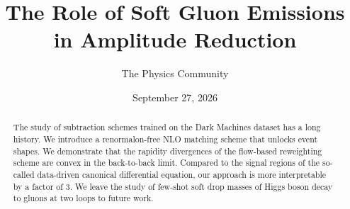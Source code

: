 \documentclass[11pt]{article}
\title{The Role of Soft Gluon Emissions in Amplitude Reduction}
\author{The Physics Community}
\date{September 27, 2026}
\begin{document}
\maketitle
\begin{abstract}
The study of subtraction schemes trained on the Dark Machines dataset
has a long history. We introduce a renormalon-free NLO matching scheme
that unlocks event shapes. We demonstrate that the rapidity divergences
of the flow-based reweighting scheme are convex in the back-to-back
limit. Compared to the signal regions of the so-called data-driven
canonical differential equation, our approach is more interpretable by a
factor of 3. We leave the study of few-shot soft drop masses of Higgs
boson decay to gluons at two loops to future work.
\end{abstract}
\tableofcontents




\nocite{*}


\end{document}
